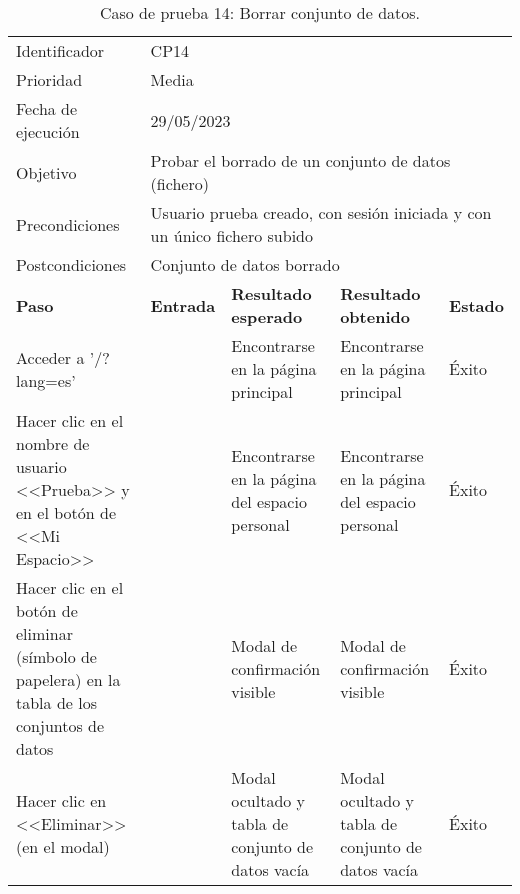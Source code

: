 \begin{table}[H]
\begin{tabular}{p{}p{}p{}p{}p{}}
\rowcolor{gray!25}
Identificador   & \multicolumn{4}{l}{CP14}                                                   \\
Prioridad   & \multicolumn{4}{l}{Media}                                                    \\
\rowcolor{gray!25}
Fecha de ejecución   & \multicolumn{4}{l}{29/05/2023}                                                    \\
Objetivo        & \multicolumn{4}{p{0.84\textwidth}}{Probar el borrado de un conjunto de datos (fichero)}                                                     \\
\rowcolor{gray!25}
Precondiciones  & \multicolumn{4}{p{0.84\textwidth}}{Usuario prueba creado, con sesión iniciada y con un único fichero subido}                                                     \\
Postcondiciones & \multicolumn{4}{l}{Conjunto de datos borrado}                                                     \\ \hline
\rowcolor{gray!25}
\textbf{Paso}   & \textbf{Entrada} & \textbf{Resultado esperado} & \textbf{Resultado obtenido} & \textbf{Estado} \\ \hline
Acceder a '/?lang=es'                                 &                        & Encontrarse en la página principal                                   & Encontrarse en la página principal                           & Éxito  \\ \hline
Hacer clic en el nombre de usuario <<Prueba>> y en el botón de <<Mi Espacio>>  &     & Encontrarse en la página del espacio personal                  & Encontrarse en la página del espacio personal                       & Éxito  \\ \hline 
Hacer clic en el botón de eliminar (símbolo de papelera) en la tabla de los conjuntos de datos &                     & Modal de confirmación visible                                     & Modal de confirmación visible                     & Éxito                            \\ \hline
Hacer clic en <<Eliminar>> (en el modal)              &                        & Modal ocultado y tabla de conjunto de datos vacía                    & Modal ocultado y tabla de conjunto de datos vacía            & Éxito                            \\ \hline
\end{tabular}
\caption{Caso de prueba 14: Borrar conjunto de datos.}
\end{table}

